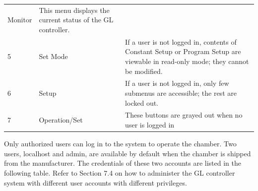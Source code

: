 \begin{longtable}[]{@{}lll@{}}
\begin{minipage}[t]{0.23\columnwidth}
Monitor\strut
\end{minipage} & \begin{minipage}[t]{0.65\columnwidth}\raggedright
This menu displays the current status of the GL controller.\strut
\end{minipage}\tabularnewline
\begin{minipage}[t]{0.04\columnwidth}\raggedright
5\strut
\end{minipage} & \begin{minipage}[t]{0.23\columnwidth}\raggedright
Set Mode\strut
\end{minipage} & \begin{minipage}[t]{0.65\columnwidth}\raggedright
If a user is not logged in, contents of Constant Setup or Program Setup
are viewable in read-only mode; they cannot be modified.\strut
\end{minipage}\tabularnewline
\begin{minipage}[t]{0.04\columnwidth}\raggedright
6\strut
\end{minipage} & \begin{minipage}[t]{0.23\columnwidth}\raggedright
Setup\strut
\end{minipage} & \begin{minipage}[t]{0.65\columnwidth}\raggedright
If a user is not logged in, only few submenus are accessible; the rest
are locked out.\strut
\end{minipage}\tabularnewline
\begin{minipage}[t]{0.04\columnwidth}\raggedright
7\strut
\end{minipage} & \begin{minipage}[t]{0.23\columnwidth}\raggedright
Operation/Set\strut
\end{minipage} & \begin{minipage}[t]{0.65\columnwidth}\raggedright
These buttons are grayed out when no user is logged in\strut
\end{minipage}\tabularnewline
\bottomrule
\end{longtable}

Only authorized users can log in to the system to operate the chamber.
Two users, localhost and admin, are available by default when the
chamber is shipped from the manufacturer. The credentials of these two
accounts are listed in the following table. Refer to Section 7.4 on how
to administer the GL controller system with different user accounts with
different privileges.

